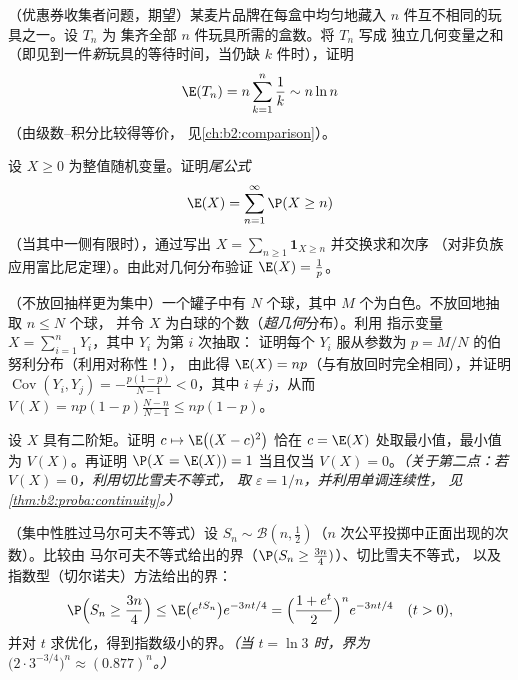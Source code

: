 \begin{exercise}[$\star$]\label{exo:b2:randomvar:3}
（优惠券收集者问题，期望）某麦片品牌在每盒中均匀地藏入
$n$ 件互不相同的玩具之一。设 $T_n$ 为
集齐全部 $n$ 件玩具所需的盒数。将 $T_n$ 写成
独立几何变量之和（即见到一件\emph{新}玩具的等待时间，当仍缺
$k$ 件时），证明
\[
\E(T_n) = n\sum_{k=1}^{n}\frac{1}{k} \sim n\ln n
\]
（由级数–积分比较得等价，
见\cref{ch:b2:comparison}）。
\end{exercise}

\begin{exercise}[$\star\star$]\label{exo:b2:randomvar:4}
设 $X \geq 0$ 为整值随机变量。证明\emph{尾公式}
\[
\E(X) = \sum_{n=1}^{\infty} \P(X \geq n)
\]
（当其中一侧有限时），通过写出 $X =
\sum_{n\geq1}\mathbf{1}_{X \geq n}$ 并交换求和次序
（对非负族应用富比尼定理）。由此对几何分布验证
$\E(X) = \frac1p$。
\end{exercise}

\begin{exercise}[$\star\star$]\label{exo:b2:randomvar:5}
（不放回抽样更为集中）一个罐子中有 $N$
个球，其中 $M$ 个为白色。不放回地抽取 $n \leq N$ 个球，
并令 $X$ 为白球的个数（\emph{超几何}分布）。利用
指示变量 $X = \sum_{i=1}^n Y_i$，其中 $Y_i$ 为第 $i$ 次抽取：
证明每个 $Y_i$ 服从参数为 $p = M/N$ 的伯努利分布（利用对称性！），
由此得 $\E(X) = np$（与有放回时完全相同），并证明
$\operatorname{Cov}(Y_i, Y_j) = -\frac{p(1-p)}{N-1} < 0$，其中 $i
\neq j$，从而 $V(X) = np(1-p)\frac{N - n}{N - 1} \leq np(1-p)$。
\end{exercise}

\begin{exercise}[$\star\star$]\label{exo:b2:randomvar:6}
设 $X$ 具有二阶矩。证明 $c \mapsto \E\bigl((X -
c)^2\bigr)$ 恰在 $c = \E(X)$ 处取最小值，最小值为
$V(X)$。再证明 $\P(X = \E(X)) = 1$ 当且仅当 $V(X) =
0$。\emph{（关于第二点：若 $V(X) = 0$，利用切比雪夫不等式，
取 $\varepsilon = 1/n$，并利用单调连续性，
见\cref{thm:b2:proba:continuity}。）}
\end{exercise}

\begin{exercise}[$\star\star\star$]\label{exo:b2:randomvar:7}
（集中性胜过马尔可夫不等式）设 $S_n \sim \mathcal{B}(n,
\frac12)$（$n$ 次公平投掷中正面出现的次数）。比较由
马尔可夫不等式给出的界（$\P(S_n \geq \frac{3n}{4})$）、切比雪夫不等式，
以及指数型（切尔诺夫）方法给出的界：
\[
\P\Bigl(S_n \geq \frac{3n}4\Bigr)
\leq \E\bigl(e^{tS_n}\bigr)e^{-3nt/4}
= \Bigl(\frac{1 + e^t}{2}\Bigr)^n e^{-3nt/4}
\quad (t > 0),
\]
并对 $t$ 求优化，得到指数级小的界。\emph{（当
$t = \ln 3$ 时，界为 $\bigl(2\cdot 3^{-3/4}\bigr)^n \approx
(0.877)^n$。）}
\end{exercise}

